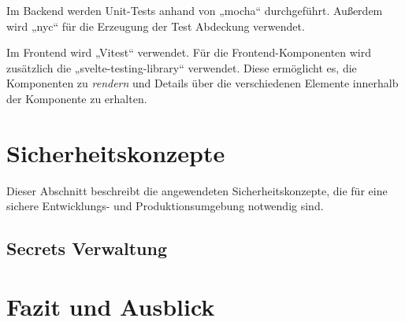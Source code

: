 \documentclass[a4paper, 10pt, conference]{IEEEtran}
\begin{document}
Im Backend werden Unit-Tests anhand von „mocha“ \cite{mochajs} durchgeführt. Außerdem wird „nyc“ \cite{instanbuljs} für die Erzeugung der Test Abdeckung verwendet. 

Im Frontend wird „Vitest“ \cite{vitest} verwendet. Für die Frontend-Komponenten wird zusätzlich die „svelte-testing-library“ \cite{stl} verwendet. Diese ermöglicht es, die Komponenten zu \textit{rendern} und Details über die verschiedenen Elemente innerhalb der Komponente zu erhalten.

\section{Sicherheitskonzepte} \label{s:sicherheitskonzepte}

Dieser Abschnitt beschreibt die angewendeten Sicherheitskonzepte, die für eine sichere Entwicklungs- und Produktionsumgebung notwendig sind.

\subsection{Secrets Verwaltung}


\section{Fazit und Ausblick} \label{s:fazit}


\printbibliography
\end{document}
